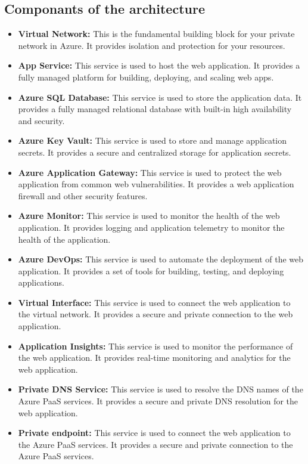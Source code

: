 \subsection{Componants of the architecture}
\begin{itemize}
    \item \textbf{Virtual Network:} This is the fundamental building block for your private network in Azure. It provides isolation and protection for your resources.
    \item \textbf{App Service:} This service is used to host the web application. It provides a fully managed platform for building, deploying, and scaling web apps.
    \item \textbf{Azure SQL Database:} This service is used to store the application data. It provides a fully managed relational database with built-in high availability and security.
    \item \textbf{Azure Key Vault:} This service is used to store and manage application secrets. It provides a secure and centralized storage for application secrets.
    \item \textbf{Azure Application Gateway:} This service is used to protect the web application from common web vulnerabilities. It provides a web application firewall and other security features.
    \item \textbf{Azure Monitor:} This service is used to monitor the health of the web application. It provides logging and application telemetry to monitor the health of the application.
    \item \textbf{Azure DevOps:} This service is used to automate the deployment of the web application. It provides a set of tools for building, testing, and deploying applications.
    \item \textbf{Virtual Interface:} This service is used to connect the web application to the virtual network. It provides a secure and private connection to the web application.
    \item \textbf{Application Insights:} This service is used to monitor the performance of the web application. It provides real-time monitoring and analytics for the web application.
    \item \textbf{Private DNS Service:} This service is used to resolve the DNS names of the Azure PaaS services. It provides a secure and private DNS resolution for the web application.
    \item \textbf{Private endpoint:} This service is used to connect the web application to the Azure PaaS services. It provides a secure and private connection to the Azure PaaS services.
\end{itemize}

